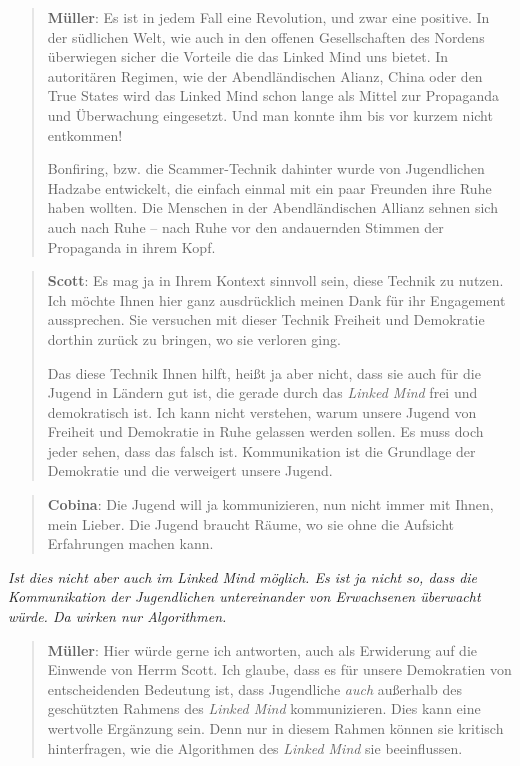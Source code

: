 \documentclass{scrartcl}
\newenvironment{frage}{\itshape}{}
\newenvironment{antworta}{
  \begin{quotation}
  }{
  \end{quotation}
}
\newenvironment{antwortb}{
  \begin{quotation}
  }{
  \end{quotation}
}
\newcommand{\name}[1]{\textbf{#1}}
\begin{document}
\begin{antworta}
\name{Müller}: Es ist in jedem Fall eine Revolution, und zwar eine
positive. In der südlichen Welt, wie auch in den offenen
Gesellschaften des Nordens überwiegen sicher die Vorteile
die das Linked Mind uns bietet. In autoritären Regimen, wie
der Abendländischen Alianz, China oder den True States wird
das Linked Mind schon lange als Mittel zur Propaganda und
Überwachung eingesetzt. Und man konnte ihm bis vor kurzem
nicht entkommen!

Bonfiring, bzw. die Scammer-Technik dahinter wurde von
Jugendlichen Hadzabe entwickelt, die einfach einmal mit ein
paar Freunden ihre Ruhe haben wollten. Die Menschen in der
Abendländischen Allianz sehnen sich auch nach Ruhe – nach
Ruhe vor den andauernden Stimmen der Propaganda in ihrem
Kopf.
\end{antworta}


\begin{antwortb}
\name{Scott}: Es mag ja in Ihrem Kontext sinnvoll sein, diese
Technik zu nutzen. Ich möchte Ihnen hier ganz ausdrücklich
meinen Dank für ihr Engagement aussprechen. Sie versuchen
mit dieser  Technik Freiheit und Demokratie dorthin zurück
zu bringen, wo sie verloren ging.

Das diese Technik Ihnen hilft, heißt ja aber nicht, dass sie
auch für die Jugend in Ländern gut ist, die gerade durch das
\emph{Linked Mind} frei und demokratisch ist. Ich kann nicht
verstehen, warum unsere Jugend von Freiheit und Demokratie
in Ruhe gelassen werden sollen. Es muss doch jeder sehen,
dass das falsch ist. Kommunikation ist die Grundlage der
Demokratie und die verweigert unsere Jugend.
\end{antwortb}


\begin{antworta}
\name{Cobina}: Die Jugend will ja kommunizieren, nun nicht immer
mit Ihnen, mein Lieber. Die Jugend braucht Räume, wo sie
ohne die Aufsicht Erfahrungen machen kann.
\end{antworta}


\begin{frage}
Ist dies nicht aber auch im \emph{Linked Mind} möglich. Es ist ja
nicht so, dass die Kommunikation der Jugendlichen
untereinander von Erwachsenen überwacht würde. Da wirken nur Algorithmen.
\end{frage}


\begin{antworta}
\name{Müller}: Hier würde gerne ich antworten, auch als Erwiderung
auf die Einwende von Herrm Scott. Ich glaube, dass es für
unsere Demokratien von entscheidenden Bedeutung ist, dass
Jugendliche \emph{auch} außerhalb des geschützten Rahmens des
\emph{Linked Mind} kommunizieren. Dies kann eine wertvolle
Ergänzung sein. Denn nur in diesem Rahmen können sie
kritisch hinterfragen, wie die Algorithmen des \emph{Linked Mind}
sie beeinflussen.
\end{antworta}
\end{document}
